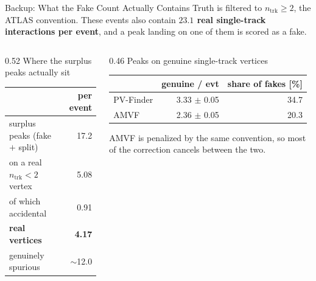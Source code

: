 \documentclass[xcolor=table,aspectratio=169]{beamer}
\newcommand{\ntrk}{\ensuremath{n_\mathrm{trk}}}
\begin{document}
\begin{frame}{Backup: What the Fake Count Actually Contains}
    \label{bk:fakes}
    \small
    Truth is filtered to $\ntrk\geq2$, the ATLAS convention. These events also contain
    \textbf{$23.1$ real single-track interactions per event}, and a peak landing on one
    of them is scored as a fake.

    \vspace{2.1em}
    \begin{columns}[t]
        \begin{column}{0.52\linewidth}
            \centering
            \footnotesize\textcolor{black!55}{Where the surplus peaks actually sit}
            \par\vspace{0.45em}
            \footnotesize
            \setlength{\tabcolsep}{6pt}
            \begin{tabular}{l r}
                \toprule
                & per event \\
                \midrule
                surplus peaks (fake $+$ split)       & 17.2\phantom{0} \\
                \quad on a real $\ntrk\!<\!2$ vertex  & \phantom{0}5.08 \\
                \quad\quad of which accidental        & \phantom{0}0.91 \\
                \midrule
                \rowcolor{black!8}
                \textbf{real vertices}                & \textbf{\phantom{0}4.17} \\
                genuinely spurious                    & ${\sim}$12.0\phantom{0} \\
                \bottomrule
            \end{tabular}
        \end{column}
        \begin{column}{0.46\linewidth}
            \centering
            \footnotesize\textcolor{black!55}{Peaks on genuine single-track vertices}
            \par\vspace{0.45em}
            \footnotesize
            \setlength{\tabcolsep}{6pt}
            \begin{tabular}{l rr}
                \toprule
                & genuine / evt & share of fakes [\%] \\
                \midrule
                PV-Finder & 3.33 $\pm$ 0.05 & 34.7 \\
                AMVF      & 2.36 $\pm$ 0.05 & 20.3 \\
                \bottomrule
            \end{tabular}
            \par\vspace{0.8em}
            \raggedright\footnotesize
            AMVF is penalized by the same convention, so most of the correction
            cancels between the two.
        \end{column}
    \end{columns}


\end{frame}
\end{document}
